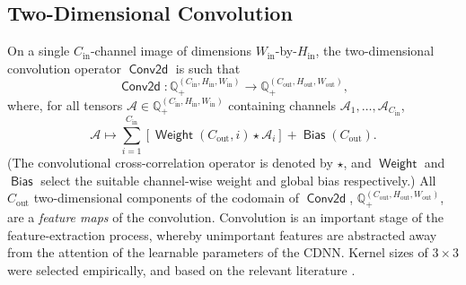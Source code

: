 \documentclass[journal]{IEEEtran}
\DeclareMathOperator\convol{\mathsf{Conv2d}}
\DeclareMathOperator\weight{\mathsf{Weight}}
\DeclareMathOperator\bias{\mathsf{Bias}}
\begin{document}
\subsection{Two-Dimensional Convolution}
On a single $C_\text{in}$-channel image of dimensions
$W_\text{in}$-by-$H_\text{in}$, the two-dimensional convolution operator
$\convol$ is such that
\begin{equation}
    \convol \colon
        \mathbb{Q}^{\left( C_\text{in}, H_\text{in}, W_\text{in} \right)}_+ \to
        \mathbb{Q}^{\left( C_\text{out}, H_\text{out}, W_\text{out} \right)}_+,
\end{equation}
where, for all tensors $\mathcal{A} \in \mathbb{Q}^{\left( C_\text{in},
H_\text{in}, W_\text{in} \right)}_+$ containing channels $\mathcal{A}_1, \ldots,
\mathcal{A}_{C_\text{in}}$,
\begin{equation}
    \mathcal{A} \mapsto \sum_{i=1}^{C_\text{in}} \left[
            \weight\left(C_\text{out}, i\right) \star \mathcal{A}_i
        \right] + \bias(C_\text{out}).
    \label{eqn:convolution}
\end{equation}
(The convolutional cross-correlation operator is denoted by $\star$, and
$\weight$ and $\bias$ select the suitable channel-wise weight and global bias
respectively.) All $C_\text{out}$ two-dimensional components of the codomain
of $\convol$, $\mathbb{Q}^{\left( C_\text{out}, H_\text{out}, W_\text{out}
\right)}_+$, are a \emph{feature maps} of the convolution.
Convolution is an important stage of the feature-extraction process, whereby
unimportant features are abstracted away from the attention of the learnable
parameters of the CDNN. Kernel sizes of $3 \times 3$ were selected empirically,
and based on the relevant literature \cite{Wang:2016}.
\end{document}
